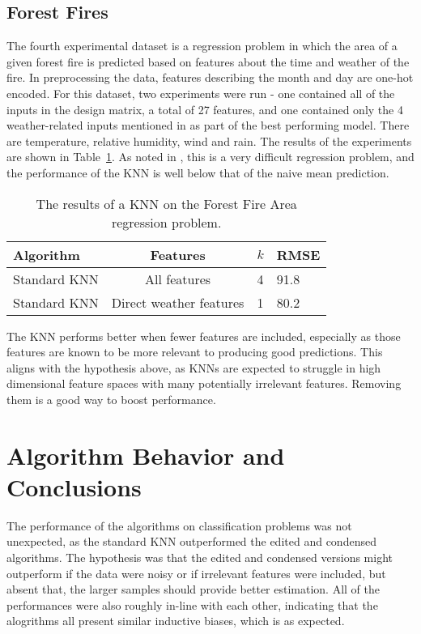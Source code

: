 \documentclass{amsart}
\begin{document}
    \subsection*{Forest Fires}
    The fourth experimental dataset is a regression problem in which the area of a given
    forest fire is predicted based on features about the time and weather of the fire\cite{ff_dataset}.
    In preprocessing the data, features describing the month and day are one-hot encoded.
    For this dataset, two experiments were run - one contained all of the inputs in the design matrix, a total
    of 27 features, and one contained only the 4 weather-related inputs mentioned in\cite{ff_dataset} as
    part of the best performing model. There are temperature, relative humidity, wind and rain.
    The results of the experiments are shown in Table~\ref{fire_forest_area}.
    As noted in \cite{ff_dataset}, this is a very difficult regression problem, and the performance
    of the KNN is well below that of the naive mean prediction.
    \begin{table}[H]
    \begin{tabular}{lccl}
        Algorithm    & Features & $k$ & RMSE \\
        \hline
        Standard KNN  & All features & 4 & 91.8 \\
        Standard KNN  & Direct weather features & 1 & 80.2
    \end{tabular}
    \label{fire_forest_area}
    \caption{The results of a KNN on the Forest Fire Area regression problem.}
    \end{table}
    The KNN performs better when fewer features are included, especially as those features are known to
    be more relevant to producing good predictions. This aligns with the hypothesis above, as KNNs are
    expected to struggle in high dimensional feature spaces with many potentially irrelevant features.
    Removing them is a good way to boost performance.

    \section{Algorithm Behavior and Conclusions}
    The performance of the algorithms on classification problems was not unexpected,
    as the standard KNN outperformed the edited and condensed algorithms. The hypothesis
    was that the edited and condensed versions might outperform if the data were noisy or if
    irrelevant features were included, but absent that, the larger samples should provide better
    estimation. All of the performances were also roughly in-line with each other, indicating that
    the alogrithms all present similar inductive biases, which is as expected.
\end{document}
